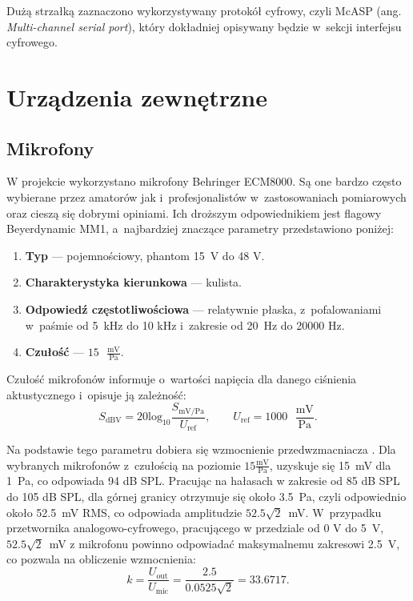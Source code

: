 Dużą strzałką zaznaczono wykorzystywany protokół cyfrowy, czyli McASP (ang.
\textit{Multi-channel serial port}), który dokładniej opisywany będzie w~sekcji
interfejsu cyfrowego.

\section{Urządzenia zewnętrzne}

\subsection{Mikrofony}

W projekcie wykorzystano mikrofony Behringer ECM8000. Są one bardzo często
wybierane przez amatorów jak i~profesjonalistów w~zastosowaniach pomiarowych
oraz cieszą się dobrymi opiniami. Ich droższym odpowiednikiem jest flagowy
Beyerdynamic MM1, a~najbardziej znaczące parametry \cite{bib:behringer}
przedstawiono poniżej:
\begin{enumerate}
    \item \textbf{Typ} --- pojemnościowy, phantom 15~V do 48 V.
    \item \textbf{Charakterystyka kierunkowa} --- kulista.
    \item \textbf{Odpowiedź częstotliwościowa} --- relatywnie płaska,
    z~pofalowaniami w~paśmie od 5~kHz do 10 kHz i~zakresie od 20~Hz do 20000 Hz.
    \item \textbf{Czułość} --- $15 \text{ }\frac{\text{mV}}{{\text{Pa}}}$.
\end{enumerate}
Czułość mikrofonów informuje o~wartości napięcia dla danego ciśnienia
aktustycznego i~opisuje ją zależność:
\begin{equation} 
        S_{\text{dBV}} = 20 \text{log}_{10} \frac{S_{\text{mV/Pa}}}{U_{\text{ref}}},
        \qquad U_{\text{ref}} = 1000 \text{ }\frac{\text{mV}}{\text{Pa}}.
\end{equation}

Na podstawie tego parametru dobiera się wzmocnienie przedwzmacniacza
\cite{bib:mic}. Dla wybranych mikrofonów z~czułością na poziomie $15 \text{
}\frac{\text{mV}}{{\text{Pa}}}$, uzyskuje się 15~mV dla 1~Pa, co odpowiada 94 dB
SPL. Pracując na hałasach w zakresie od 85 dB SPL do 105 dB SPL, dla górnej
granicy otrzymuje się około 3.5~Pa, czyli odpowiednio około 52.5~mV RMS, co
odpowiada amplitudzie $52.5\sqrt{2}$~mV. W~przypadku przetwornika
analogowo-cyfrowego, pracującego w przedziale od 0 V do 5~V, $52.5\sqrt{2}$~mV z
mikrofonu powinno odpowiadać maksymalnemu zakresowi 2.5~V, co pozwala na
obliczenie wzmocnienia:
\begin{equation}
        k = \frac{U_{\text{out}}}{U_{\text{mic}}} = 
	    \frac{2.5}{0.0525\sqrt{2}} =  33.6717.
        \label{eq::k_preamp}
\end{equation}

